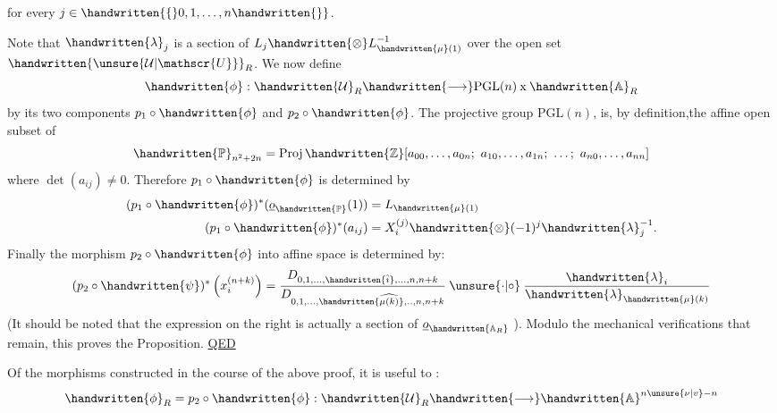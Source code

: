 for every $j\in\handwritten{\{}0,1,\ldots,n\handwritten{\}}$.

Note that $\handwritten{\lambda}_j$ is a section of $L_j\handwritten{\otimes}L_{\handwritten{\mu}(1)}^{-1}$ over the open set
$\handwritten{\unsure{\mathcal{U}|\mathscr{U}}}_R$. We now define
\[
\handwritten{\phi}:\handwritten{\mathcal{U}}_R\handwritten{\longrightarrow}\mathrm{PGL}(n)\mathbin{\mathrm{x}}\handwritten{\mathbb{A}}_R
\]
by its two components $p_1\circ\handwritten{\phi}$ and $p_2\circ\handwritten{\phi}$. The projective group
$\mathrm{PGL}(n)$, is, by definition,the affine open subset of
\[
\handwritten{\mathbb{P}}_{n^2+2n}=\operatorname{Proj}\handwritten{\mathbb{Z}}[a_{00},\ldots,a_{0n};\ a_{10},\ldots,a_{1n};\ \ldots;\ a_{n0},\ldots,a_{nn}]
\]
where $\det(a_{ij})\ne 0$. Therefore $p_1\circ\handwritten{\phi}$ is determined by
\[
\begin{aligned}
(p_1\circ\handwritten{\phi})^*(\underline{o}_{\handwritten{\mathbb{P}}}(1))&=L_{\handwritten{\mu}(1)}\\
(p_1\circ\handwritten{\phi})^*(a_{ij})&=X_i^{(j)}\handwritten{\otimes}(-1)^j\handwritten{\lambda}_j^{-1}.
\end{aligned}
\]
Finally the morphism $p_2\circ\handwritten{\phi}$ into affine space is determined by:
\[
(p_2\circ\handwritten{\psi})^*\left(x_i^{(n+k)}\right)=
\frac{D_{0,1,\ldots,\handwritten{\hat{i}},\ldots,n,n+k}}{D_{0,1,\ldots,\handwritten{\widehat{\mu(k)}},..,n,n+k}}\mathbin{\unsure{\cdot|\circ}}
\frac{\handwritten{\lambda}_i}{\handwritten{\lambda}_{\handwritten{\mu}(k)}}
\]
(It should be noted that the expression on the right is actually a
section of $\underline{o}_{\handwritten{\mathbb{A}_R}}$ ). Modulo the mechanical verifications that remain,
this proves the Proposition. \quad\uline{QED}

Of the morphisms constructed in the course of the above proof, it
is useful to  :
\[
\handwritten{\phi}_R=p_2\circ\handwritten{\phi}:\handwritten{\mathcal{U}}_R\handwritten{\longrightarrow}\handwritten{\mathbb{A}}^{n\unsure{\nu|v}-n}
\]

